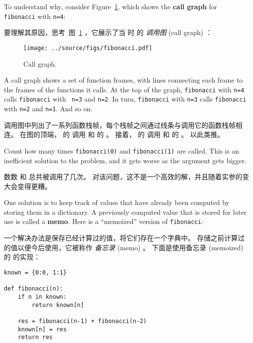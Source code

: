   

To understand why, consider Figure~\ref{fig.fibonacci}, which shows
the {\bf call graph} for {\tt fibonacci} with {\tt n=4}:

要理解其原因，思考 图~\ref{fig.fibonacci} ，它展示了当  时  的 {\em 调用图} (call graph) ：

\begin{figure}
\centerline
{\texttt{[image: ../source/figs/fibonacci.pdf]}}
\caption{Call graph.}
\label{fig.fibonacci}
\end{figure}

A call graph shows a set of function frames, with lines connecting each
frame to the frames of the functions it calls.  At the top of the
graph, {\tt fibonacci} with {\tt n=4} calls {\tt fibonacci} with {\tt
n=3} and {\tt n=2}.  In turn, {\tt fibonacci} with {\tt n=3} calls
{\tt fibonacci} with {\tt n=2} and {\tt n=1}.  And so on.

调用图中列出了一系列函数栈帧，每个栈帧之间通过线条与调用它的函数栈帧相连。
在图的顶端， 的  调用  和  的  。 接着，  的  调用  和  的 。 以此类推。

  

Count how many times {\tt fibonacci(0)} and {\tt fibonacci(1)} are
called.  This is an inefficient solution to the problem, and it gets
worse as the argument gets bigger.

数数  和  总共被调用了几次。
对该问题，这不是一个高效的解，并且随着实参的变大会变得更糟。


One solution is to keep track of values that have already been
computed by storing them in a dictionary.  A previously computed value
that is stored for later use is called a {\bf memo}.  Here is a
``memoized'' version of {\tt fibonacci}:

一个解决办法是保存已经计算过的值，将它们存在一个字典中。
存储之前计算过的值以便今后使用，它被称作 {\em 备忘录} (memo) 。
下面是使用备忘录 (memoized) 的  的实现：

\begin{lstlisting}
known = {0:0, 1:1}

def fibonacci(n):
    if n in known:
        return known[n]

    res = fibonacci(n-1) + fibonacci(n-2)
    known[n] = res
    return res
\end{lstlisting}

